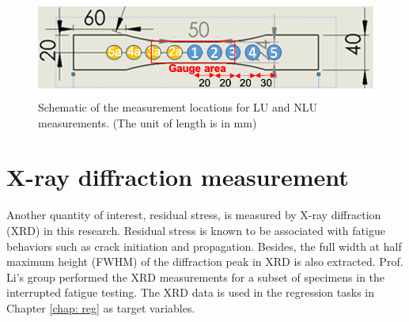 \begin{figure}[tb]
  \includegraphics[width=\linewidth]{fig/specimen_measurment_locs.png}
  \caption{Schematic of the measurement locations for LU and NLU measurements. (The unit of length is in mm)}
  \label{fig: measurement locations}
\end{figure}

\section{X-ray diffraction measurement}
Another quantity of interest, residual stress, is measured by X-ray diffraction (XRD) in this research. Residual stress is known to be associated with fatigue behaviors such as crack initiation and propagation. Besides, the full width at half maximum height (FWHM) of the diffraction peak in XRD is also extracted. Prof. Li's group performed the XRD measurements for a subset of specimens in the interrupted fatigue testing. The XRD data is used in the regression tasks in Chapter \ref{chap: reg} as target variables.

